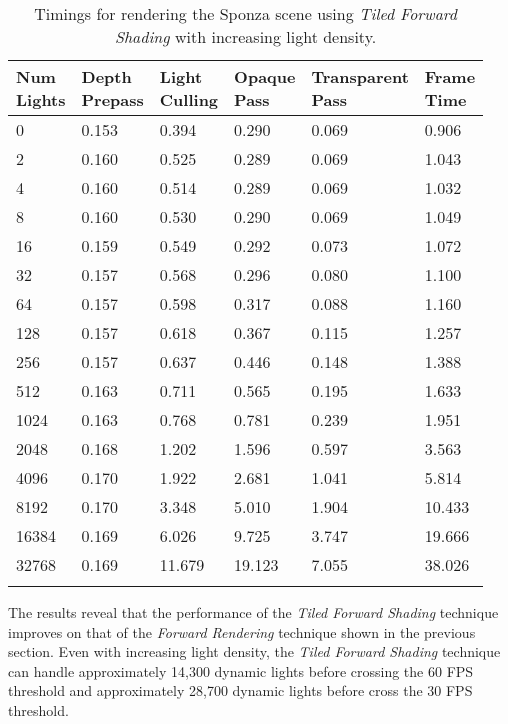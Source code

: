 \begin{table}[H]
\caption{Timings for rendering the Sponza scene using \emph{Tiled Forward Shading} with increasing light density.}
\label{tab:TiledForward_1920x1080_Sponza}
\centering
\begin{tabular}{*{6}{l}}
\toprule
\thead{Num \\Lights} & \thead{Depth \\Prepass} & \thead{Light \\Culling} & \thead{Opaque \\Pass} & \thead{Transparent \\Pass} & \thead{Frame \\Time } \\
\midrule
0 & 0.153 & 0.394 & 0.290 & 0.069 & 0.906 \\
2 & 0.160 & 0.525 & 0.289 & 0.069 & 1.043 \\
4 & 0.160 & 0.514 & 0.289 & 0.069 & 1.032 \\
8 & 0.160 & 0.530 & 0.290 & 0.069 & 1.049 \\
16 & 0.159 & 0.549 & 0.292 & 0.073 & 1.072 \\
32 & 0.157 & 0.568 & 0.296 & 0.080 & 1.100 \\
64 & 0.157 & 0.598 & 0.317 & 0.088 & 1.160 \\
128 & 0.157 & 0.618 & 0.367 & 0.115 & 1.257 \\
256 & 0.157 & 0.637 & 0.446 & 0.148 & 1.388 \\
512 & 0.163 & 0.711 & 0.565 & 0.195 & 1.633 \\
1024 & 0.163 & 0.768 & 0.781 & 0.239 & 1.951 \\
2048 & 0.168 & 1.202 & 1.596 & 0.597 & 3.563 \\
4096 & 0.170 & 1.922 & 2.681 & 1.041 & 5.814 \\
8192 & 0.170 & 3.348 & 5.010 & 1.904 & 10.433 \\
16384 & 0.169 & 6.026 & 9.725 & 3.747 & 19.666 \\
32768 & 0.169 & 11.679 & 19.123 & 7.055 & 38.026 \\
\bottomrule\\
\end{tabular}
\end{table}

The results reveal that the performance of the \emph{Tiled Forward Shading} technique improves on that of the \emph{Forward Rendering} technique shown in the previous section. Even with increasing light density, the \emph{Tiled Forward Shading} technique can handle approximately 14,300 dynamic lights before crossing the 60 FPS threshold and approximately 28,700 dynamic lights before cross the 30 FPS threshold.

